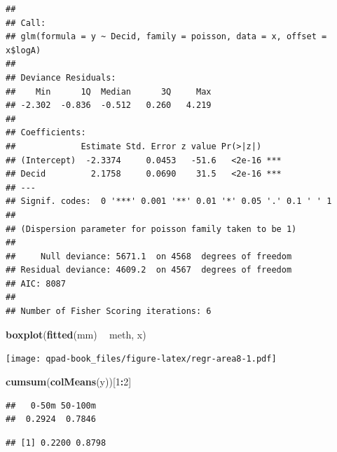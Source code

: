 \documentclass[12pt,]{book}
\newenvironment{Shaded}{\begin{snugshade}}{\end{snugshade}}
\newcommand{\CommentTok}[1]{\textcolor[rgb]{0.56,0.35,0.01}{\textit{#1}}}
\newcommand{\DecValTok}[1]{\textcolor[rgb]{0.00,0.00,0.81}{#1}}
\newcommand{\FloatTok}[1]{\textcolor[rgb]{0.00,0.00,0.81}{#1}}
\newcommand{\KeywordTok}[1]{\textcolor[rgb]{0.13,0.29,0.53}{\textbf{#1}}}
\newcommand{\NormalTok}[1]{#1}
\newcommand{\OperatorTok}[1]{\textcolor[rgb]{0.81,0.36,0.00}{\textbf{#1}}}
\newcommand{\StringTok}[1]{\textcolor[rgb]{0.31,0.60,0.02}{#1}}
\begin{document}
\begin{verbatim}
## 
## Call:
## glm(formula = y ~ Decid, family = poisson, data = x, offset = x$logA)
## 
## Deviance Residuals: 
##    Min      1Q  Median      3Q     Max  
## -2.302  -0.836  -0.512   0.260   4.219  
## 
## Coefficients:
##             Estimate Std. Error z value Pr(>|z|)    
## (Intercept)  -2.3374     0.0453   -51.6   <2e-16 ***
## Decid         2.1758     0.0690    31.5   <2e-16 ***
## ---
## Signif. codes:  0 '***' 0.001 '**' 0.01 '*' 0.05 '.' 0.1 ' ' 1
## 
## (Dispersion parameter for poisson family taken to be 1)
## 
##     Null deviance: 5671.1  on 4568  degrees of freedom
## Residual deviance: 4609.2  on 4567  degrees of freedom
## AIC: 8087
## 
## Number of Fisher Scoring iterations: 6
\end{verbatim}

\begin{Shaded}
\begin{Highlighting}[]
\KeywordTok{boxplot}\NormalTok{(}\KeywordTok{fitted}\NormalTok{(mm) }\OperatorTok{~}\StringTok{ }\NormalTok{meth, x)}
\end{Highlighting}
\end{Shaded}

\texttt{[image: qpad-book\_files/figure-latex/regr-area8-1.pdf]}

\begin{Shaded}
\begin{Highlighting}[]
\KeywordTok{cumsum}\NormalTok{(}\KeywordTok{colMeans}\NormalTok{(y))[}\DecValTok{1}\OperatorTok{:}\DecValTok{2}\NormalTok{]}
\end{Highlighting}
\end{Shaded}

\begin{verbatim}
##   0-50m 50-100m 
##  0.2924  0.7846
\end{verbatim}

\begin{Shaded}
\end{Shaded}

\begin{verbatim}
## [1] 0.2200 0.8798
\end{verbatim}
\end{document}
